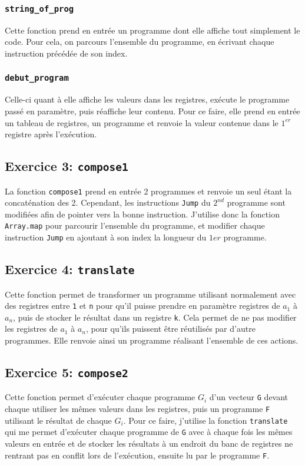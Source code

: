 \documentclass[11pt, a4paper, twoside, titlepage]{article}
\begin{document}
\subsubsection{\texttt{string\_of\_prog}}
Cette fonction prend en entrée un programme dont elle affiche tout simplement le code. Pour cela, on parcours l'ensemble du programme, en écrivant chaque instruction précédée de son index.

\subsubsection{\texttt{debut\_program}}
Celle-ci quant à elle affiche les valeurs dans les registres, exécute le programme passé en paramètre, puis réaffiche leur contenu. Pour ce faire, elle prend en entrée un tableau de registres, un programme et renvoie la valeur contenue dans le $1^{er}$ registre après l'exécution.

\subsection{Exercice 3: \texttt{compose1}}
La fonction \texttt{compose1} prend en entrée 2 programmes et renvoie un seul étant la concaténation des 2. Cependant, les instructions \texttt{Jump} du $2^{nd}$ programme sont modifiées afin de pointer vers la bonne instruction. J'utilise donc la fonction \texttt{Array.map} pour parcourir l'ensemble du programme, et modifier chaque instruction \texttt{Jump} en ajoutant à son index la longueur du $1{er}$ programme.

\subsection{Exercice 4: \texttt{translate}}
Cette fonction permet de transformer un programme utilisant normalement avec des registres entre \texttt{1} et \texttt{n} pour qu'il puisse prendre en paramètre registres de \texttt{$a_1$} à \texttt{$a_n$}, puis de stocker le résultat dans un registre \texttt{k}. Cela permet de ne pas modifier les registres de \texttt{$a_1$} à \texttt{$a_n$}, pour qu'ils puissent être réutilisés par d'autre programmes. Elle renvoie ainsi un programme réalisant l'ensemble de ces actions.

\subsection{Exercice 5: \texttt{compose2}}
Cette fonction permet d'exécuter chaque programme \texttt{$G_i$} d'un vecteur \texttt{G} devant chaque utiliser les mêmes valeurs dans les registres, puis un programme \texttt{F} utilisant le résultat de chaque \texttt{$G_i$}. Pour ce faire, j'utilise la fonction \texttt{translate} qui me permet d'exécuter chaque programme de \texttt{G} avec à chaque fois les mêmes valeurs en entrée et de stocker les résultats à un endroit du banc de registres ne rentrant pas en conflit lors de l'exécution, ensuite lu par le programme \texttt{F}.
\end{document}
